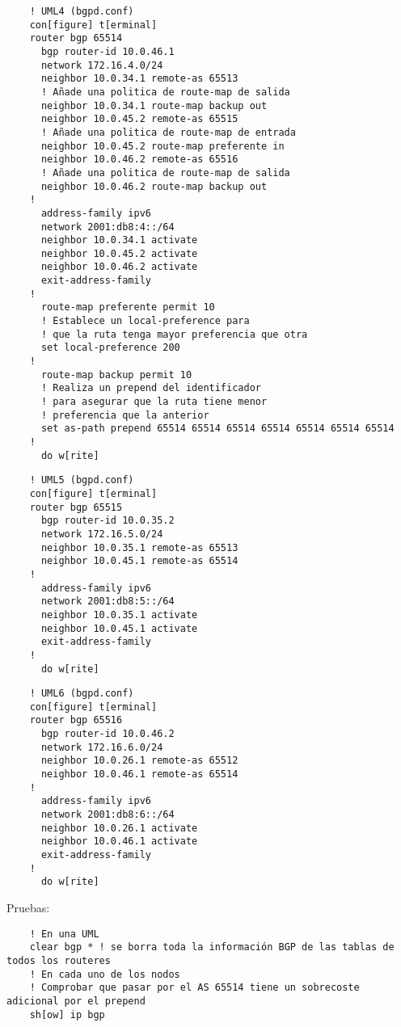   \begin{verbatim}
    ! UML4 (bgpd.conf)
    con[figure] t[erminal]
    router bgp 65514
      bgp router-id 10.0.46.1
      network 172.16.4.0/24
      neighbor 10.0.34.1 remote-as 65513
      ! Añade una politica de route-map de salida
      neighbor 10.0.34.1 route-map backup out
      neighbor 10.0.45.2 remote-as 65515
      ! Añade una politica de route-map de entrada
      neighbor 10.0.45.2 route-map preferente in
      neighbor 10.0.46.2 remote-as 65516
      ! Añade una politica de route-map de salida
      neighbor 10.0.46.2 route-map backup out
    !
      address-family ipv6
      network 2001:db8:4::/64
      neighbor 10.0.34.1 activate
      neighbor 10.0.45.2 activate
      neighbor 10.0.46.2 activate
      exit-address-family
    !
      route-map preferente permit 10
      ! Establece un local-preference para
      ! que la ruta tenga mayor preferencia que otra
      set local-preference 200
    !
      route-map backup permit 10
      ! Realiza un prepend del identificador
      ! para asegurar que la ruta tiene menor
      ! preferencia que la anterior
      set as-path prepend 65514 65514 65514 65514 65514 65514 65514
    !
      do w[rite]
  \end{verbatim}

  \begin{verbatim}
    ! UML5 (bgpd.conf)
    con[figure] t[erminal]
    router bgp 65515
      bgp router-id 10.0.35.2
      network 172.16.5.0/24
      neighbor 10.0.35.1 remote-as 65513
      neighbor 10.0.45.1 remote-as 65514
    !
      address-family ipv6
      network 2001:db8:5::/64
      neighbor 10.0.35.1 activate
      neighbor 10.0.45.1 activate
      exit-address-family
    !
      do w[rite]
  \end{verbatim}

  \begin{verbatim}
    ! UML6 (bgpd.conf)
    con[figure] t[erminal]
    router bgp 65516
      bgp router-id 10.0.46.2
      network 172.16.6.0/24
      neighbor 10.0.26.1 remote-as 65512
      neighbor 10.0.46.1 remote-as 65514
    !
      address-family ipv6
      network 2001:db8:6::/64
      neighbor 10.0.26.1 activate
      neighbor 10.0.46.1 activate
      exit-address-family
    !
      do w[rite]
  \end{verbatim}

  Pruebas:
  \begin{verbatim}
    ! En una UML
    clear bgp * ! se borra toda la información BGP de las tablas de todos los routeres
    ! En cada uno de los nodos
    ! Comprobar que pasar por el AS 65514 tiene un sobrecoste adicional por el prepend
    sh[ow] ip bgp
  \end{verbatim}
